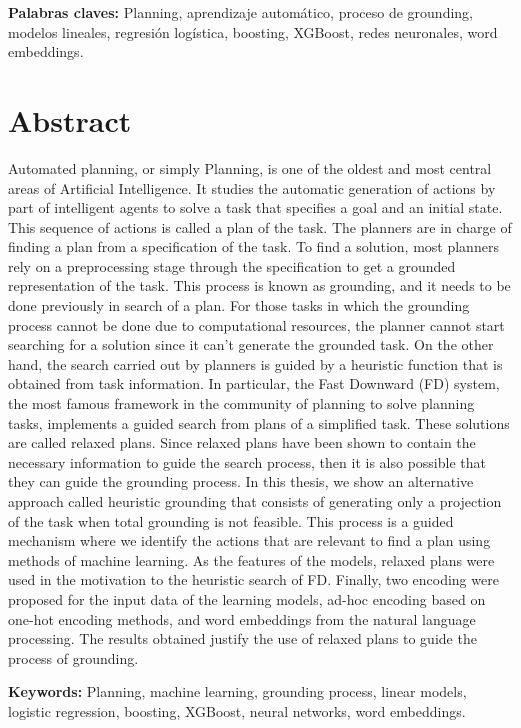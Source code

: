 \noindent %
\textbf{Palabras claves:} Planning, aprendizaje automático, proceso de
grounding, modelos lineales, regresión logística, boosting, XGBoost, redes neuronales,
word embeddings.

\section*{Abstract}

Automated planning, or simply Planning, is one of the oldest and most central
areas of Artificial Intelligence.  It studies the automatic generation of
actions by part of intelligent agents to solve a task that specifies a goal and
an initial state. This sequence of actions is called a plan of the task. The
planners are in charge of finding a plan from a specification of the task. To
find a solution, most planners rely on a  preprocessing stage through the
specification to get a grounded representation of the task. This process is
known as grounding, and it needs to be done previously in search of a plan. For
those tasks in which the grounding process cannot be done due to computational
resources, the planner cannot start searching for a solution since it can't
generate the grounded task. On the other hand, the search carried out by
planners is guided by a heuristic function that is obtained from task
information. In particular, the Fast Downward (FD) system, the most famous
framework in the community of planning to solve planning tasks, implements a
guided search from plans of a simplified task. These solutions are called
relaxed plans. Since relaxed plans have been shown to contain the necessary
information to guide the search process, then it is also possible that they can
guide the grounding process. In this thesis, we show an alternative approach
called heuristic grounding that consists of generating only a projection of the
task when total grounding is not feasible. This process is a guided mechanism
where we identify the actions that are relevant to find a plan using methods of
machine learning. As the features of the models, relaxed plans were used in the
motivation to the heuristic search of FD. Finally, two encoding were proposed
for the input data of the learning models, ad-hoc encoding based on one-hot
encoding methods, and word embeddings from the natural language processing. The
results obtained justify the use of relaxed plans to guide the process of
grounding.

\textbf{Keywords:} Planning, machine learning, grounding process, linear models,
logistic regression, boosting, XGBoost, neural networks, word embeddings.
